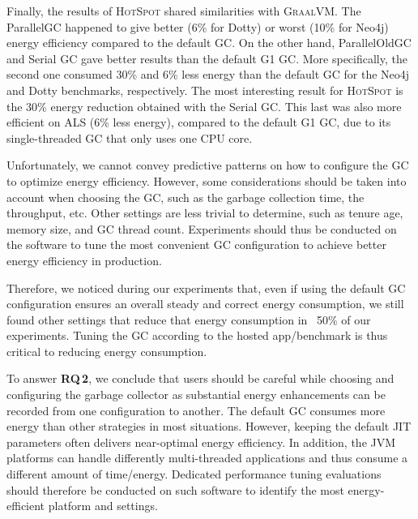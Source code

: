 Finally, the results of \textsc{HotSpot} shared similarities with \textsc{GraalVM}.
The \textsf{ParallelGC} happened to give better (6\% for \textsf{Dotty}) or worst (10\% for \textsf{Neo4j}) energy efficiency compared to the default GC.
On the other hand, \textsf{ParallelOldGC} and \textsf{Serial} GC gave better results than the default G1 GC.
More specifically, the second one consumed 30\% and 6\% less energy than the default GC for the \textsf{Neo4j} and \textsf{Dotty} benchmarks, respectively.
The most interesting result for \textsc{HotSpot} is the 30\% energy reduction obtained with the \textsf{Serial} GC.
This last was also more efficient on ALS (6\% less energy), compared to the default G1 GC, due to its single-threaded GC that only uses one CPU core.

Unfortunately, we cannot convey predictive patterns on how to configure the GC to optimize energy efficiency.
However, some considerations should be taken into account when choosing the GC, such as the garbage collection time, the throughput, etc.
Other settings are less trivial to determine, such as tenure age, memory size, and GC thread count.
Experiments should thus be conducted on the software to tune the most convenient GC configuration to achieve better energy efficiency in production.

Therefore, we noticed during our experiments that, even if using the default GC configuration ensures an overall steady and correct energy consumption, we still found other settings that reduce that energy consumption in ~50\% of our experiments.
Tuning the GC according to the hosted app/benchmark is thus critical to reducing energy consumption.

\bigbreak
\begin{mdframed}[]
    To answer \textbf{RQ\,2}, we conclude that users should be careful while choosing and configuring the garbage collector as substantial energy enhancements can be recorded from one configuration to another.
    The default GC consumes more energy than other strategies in most situations.
    However, keeping the default JIT parameters often delivers near-optimal energy efficiency.
    In addition, the JVM platforms can handle differently multi-threaded applications and thus consume a different amount of time/energy.
    Dedicated performance tuning evaluations should therefore be conducted on such software to identify the most energy-efficient platform and settings.
\end{mdframed}



